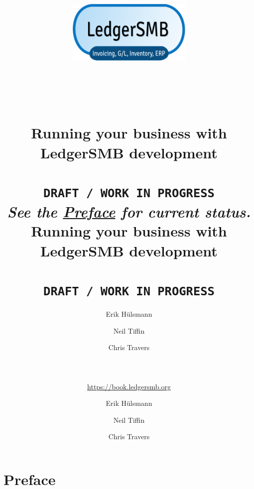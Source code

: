 \documentclass[10pt,a4paper]{book}
\newcommand{\ledgerSMBversion}{development }
\begin{document}
\ifpdf
    \author{Erik H\"ulsmann \and Neil Tiffin \and Chris Travers \\
    ~ \\
    ~ \\
    ~ \\
     \url{https://book.ledgersmb.org}
    } 
    
    \title{
        \includegraphics[width=0.45\textwidth]{NewLedgerSMBLogo512x256.png}\\
        ~ \\
        ~ \\
        ~ \\
        Running your business with\\
        {\Huge LedgerSMB \ledgerSMBversion} \\
        ~ \\
        \texttt{DRAFT / WORK IN PROGRESS} \\
        \normalsize{\emph{See the \hyperref[preface]{Preface}  for current status.}}\\
    }
    \maketitle

\else

    \author{Erik H\"ulsmann \and Neil Tiffin \and Chris Travers}
    \title{
        Running your business with
        LedgerSMB \ledgerSMBversion \\
        ~ \\
        \texttt{DRAFT / WORK IN PROGRESS} \\
    }

    \maketitle

\fi

\tableofcontents

\listoffigures

\listoftables

\cleardoublepage

\section*{Preface}
\label{preface}
\end{document}
